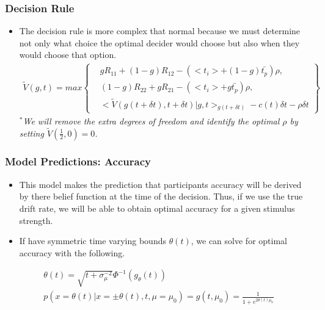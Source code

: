 \documentclass[xcolor=dvipsnames]{beamer} %
\begin{document}
\begin{frame} %
	\frametitle{Decision Rule}
	\begin{itemize}
		\item The decision rule is more complex that normal because we must determine not only what choice the optimal decider would choose but also when they would choose that option.
		\begin{gather*}
			\tilde{V}(g,t) = max \left\{\begin{split}
				&gR_{11} + (1-g)R_{12} - (<t_i> + (1-g)\bar{t_p})\rho\text{,}\\
				&(1-g)R_{22} + gR_{21} - (<t_i> + g\bar{t_p})\rho\text{,}\\
				&<\tilde{V}(g(t+\delta t),t + \delta t)|g,t>_{g(t+\delta t)} - c(t)\delta t - \rho\delta t
			\end{split}\right\}
		\end{gather*}
		\textit{\tiny $^*$We will remove the extra degrees of freedom and identify the optimal $\rho$ by setting $\tilde{V}(\textstyle\frac{1}{2},0) = 0$.}
	\end{itemize}
\end{frame}





\begin{frame} %
	\frametitle{Model Predictions: Accuracy}
	\begin{itemize}
		\item This model makes the prediction that participants accuracy will be derived by there belief function at the time of the decision. Thus, if we use the true drift rate, we will be able to obtain optimal accuracy for a given stimulus strength. 
		\item If have symmetric time varying bounds $\theta(t)$, we can solve for optimal accuracy with the following.
	\end{itemize}
		\begin{gather*}
			\theta(t) = \sqrt{t + \sigma_\mu^{-2}}\Phi^{-1}(g_\theta(t))\\
			p(x = \theta(t)| x = \pm\theta(t),t,\mu = \mu_0) = g(t,\mu_0) = \frac{1}{1+e^{2\theta(t)\mu_0}}
		\end{gather*}
\end{frame}
\end{document}
